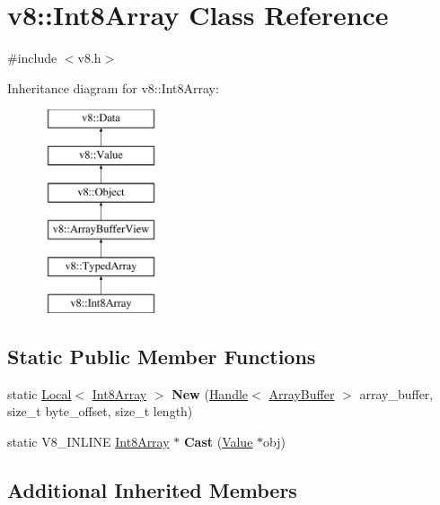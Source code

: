 \hypertarget{classv8_1_1Int8Array}{}\section{v8\+:\+:Int8\+Array Class Reference}
\label{classv8_1_1Int8Array}


{\ttfamily \#include $<$v8.\+h$>$}

Inheritance diagram for v8\+:\+:Int8\+Array\+:\begin{figure}[H]
\begin{center}
\leavevmode
\includegraphics[height=6.000000cm]{classv8_1_1Int8Array}
\end{center}
\end{figure}
\subsection*{Static Public Member Functions}
\begin{DoxyCompactItemize}
\item 
\hypertarget{classv8_1_1Int8Array_a40454c011895180c803650ba7294139b}{}static \hyperlink{classv8_1_1Local}{Local}$<$ \hyperlink{classv8_1_1Int8Array}{Int8\+Array} $>$ {\bfseries New} (\hyperlink{classv8_1_1Handle}{Handle}$<$ \hyperlink{classv8_1_1ArrayBuffer}{Array\+Buffer} $>$ array\+\_\+buffer, size\+\_\+t byte\+\_\+offset, size\+\_\+t length)\label{classv8_1_1Int8Array_a40454c011895180c803650ba7294139b}

\item 
\hypertarget{classv8_1_1Int8Array_a201a6b46e2cc455830d62c57bc8b4a3e}{}static V8\+\_\+\+I\+N\+L\+I\+N\+E \hyperlink{classv8_1_1Int8Array}{Int8\+Array} $\ast$ {\bfseries Cast} (\hyperlink{classv8_1_1Value}{Value} $\ast$obj)\label{classv8_1_1Int8Array_a201a6b46e2cc455830d62c57bc8b4a3e}

\end{DoxyCompactItemize}
\subsection*{Additional Inherited Members}


